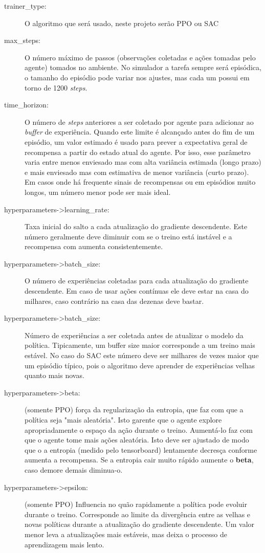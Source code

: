 \begin{description}
   \item [trainer\_type:] O algoritmo que será usado, neste projeto serão PPO ou SAC
   \item [max\_steps:] O número máximo de passos (observações coletadas e ações tomadas pelo agente) tomados  no ambiente. No simulador a tarefa sempre será episódica, o tamanho do episódio pode variar nos ajustes, mas cada um possui em torno de 1200 \textit{steps}.
   \item [time\_horizon:] O número de \textit{steps} anteriores a ser coletado por agente para adicionar ao \textit{buffer} de experiência. Quando este limite é alcançado antes do fim de um episódio, um valor estimado é usado para prever a expectativa geral de recompensa a partir do estado atual do agente. Por isso, esse parâmetro varia entre menos enviesado mas com alta variância estimada (longo prazo) e mais enviesado mas com estimativa de menor variância (curto prazo). Em casos onde há frequente sinais de recompensas ou em episódios muito longos, um número menor pode ser mais ideal.
   \item [hyperparameters->learning\_rate:] Taxa inicial do salto a cada atualização do gradiente descendente. Este número geralmente deve diminuir com se o treino está instável e a recompensa com aumenta consistentemente.
   \item [hyperparameters->batch\_size:] O número de experiências coletadas para cada atualização do gradiente descendente. Em caso de usar ações contínuas ele deve estar na casa do milhares, caso contrário na casa das dezenas deve bastar.
   \item [hyperparameters->batch\_size:] Número de experiências a ser coletada antes de atualizar o modelo da política. Tipicamente, um buffer size maior corresponde a um treino mais estável. No caso do SAC este número deve ser milhares de vezes maior que um episódio típico, pois o algoritmo deve aprender de experiências velhas quanto mais novas.
   \item [hyperparameters->beta:] (somente PPO) força da regularização da entropia, que faz com que a política seja "mais aleatória". Isto garente que o agente explore apropriadamente o espaço da ação durante o treino. Aumentá-lo faz com que o agente tome mais ações aleatória. Isto deve ser ajustado de modo que o a entropia (medido pelo tensorboard) lentamente decresça conforme aumenta a recompensa. Se a entropia cair muito rápido aumente o \textbf{beta}, caso demore demais diminua-o.
   \item [hyperparameters->epsilon:] (somente PPO) Influencia no quão rapidamente a política pode evoluir durante o treino. Corresponde ao limite da divergência entre as velhas e novas políticas durante a atualização do gradiente descendente. Um valor menor leva a atualizações mais estáveis, mas deixa o processo de aprendizagem mais lento.

\end{description}
